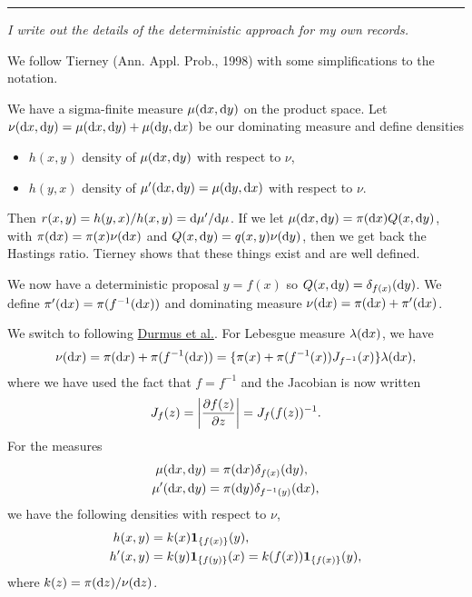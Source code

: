 \documentclass[11pt,a4paper]{article}
\begin{document}
\noindent\rule{\textwidth}{1pt}

\emph{I write out the details of the deterministic approach for my own records.}

We follow Tierney (Ann. Appl. Prob., 1998) with some simplifications to the notation.

We have a sigma-finite measure $ \mu(\ud x, \ud y) $ on the product space. Let $ \nu(\ud x, \ud y) = \mu(\ud x, \ud y) +  \mu(\ud y, \ud x) $ be our dominating measure and define densities
\begin{itemize}
    \item $ h(x, y) $ density of $ \mu(\ud x, \ud y) $ with respect to $ \nu $,
    \item $ h(y, x) $ density of $ \mu'(\ud x, \ud y) = \mu(\ud y, \ud x) $ with respect to $ \nu $.
\end{itemize}
Then $ r(x, y) = h(y, x) / h(x, y) = \ud \mu' / \ud \mu $. If we let $ \mu(\ud x, \ud y) = \pi(\ud x) Q(x, \ud y) $, with $ \pi(\ud x) = \pi(x) \nu(\ud x) $ and $ Q(x, \ud y) = q(x, y) \nu(\ud y) $, then we get back the Hastings ratio. Tierney shows that these things exist and are well defined.

We now have a deterministic proposal $ y = f(x) $ so $ Q(x, \ud y) = \delta_{f(x)}(\ud y) $. We define $ \pi'(\ud x) = \pi(f^{-1}(\ud x)) $ and dominating measure $ \nu(\ud x) = \pi(\ud x) + \pi'(\ud x) $.

We switch to following \href{https://palaisien.herokuapp.com/static/programme/slides/2021-01-05_Alain-Durmus.pdf}{Durmus et al.}. For Lebesgue measure $ \lambda(\ud x) $, we have
\[
    \nu(\ud x)
        = \pi(\ud x) + \pi(f^{-1}(\ud x))
        = \{\pi(x) + \pi(f^{-1}(x)) J_{f^{-1}}(x)\} \lambda(\ud x),
\]
where we have used the fact that $ f = f^{-1} $ and the Jacobian is now written
\[
    J_f(z)
        = \abs*{\frac{\pd f(z)}{\pd z}}
        = J_f(f(z))^{-1}.
\]
For the measures
\begin{align*}
    \mu(\ud x, \ud y) &= \pi(\ud x) \delta_{f(x)}(\ud y), \\
    \mu'(\ud x, \ud y) &= \pi(\ud y) \delta_{f^{-1}(y)}(\ud x),
\end{align*}
we have the following densities with respect to $ \nu $,
\begin{align*}
    h(x, y) &= k(x) \ind{f(x)}(y), \\
    h'(x, y) &= k(y) \ind{f(y)}(x) = k(f(x)) \ind{f(x)}(y),
\end{align*}
where $ k(z) = \pi(\ud z) / \nu(\ud z) $.
\end{document}
